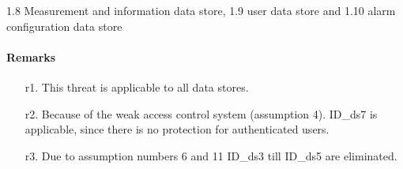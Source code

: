 1.8 Measurement and information data store, 1.9 user data store and 1.10 alarm
configuration data store

\paragraph{Remarks}
	\begin{enumerate}
         \item[r1.] This threat is applicable to all data stores.
         \item[r2.] Because of the weak access control system (assumption 4).
         ID\_ds7 is applicable, since there is no protection for authenticated
         users.
         \item[r3.] Due to assumption numbers 6 and 11 ID\_ds3 till ID\_ds5 are
         eliminated.
    \end{enumerate}
